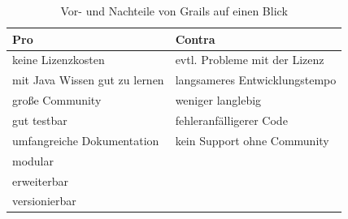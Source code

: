   \begin{table}[H]
  \centering
    \begin{tabular}{l l}
	  \toprule
	  Pro & Contra \\
	  \midrule
	  keine Lizenzkosten &  evtl. Probleme mit der Lizenz \\
	  mit Java Wissen gut zu lernen &  langsameres Entwicklungstempo \\
	  große Community &  weniger langlebig\\
	  gut testbar &  fehleranfälligerer Code\\
	  umfangreiche Dokumentation &  kein Support ohne Community \\
	  modular &   \\
	  erweiterbar &   \\
	  versionierbar &    \\
	  \bottomrule
    \end{tabular}
    \caption{Vor- und Nachteile von Grails auf einen Blick}
  \end{table}